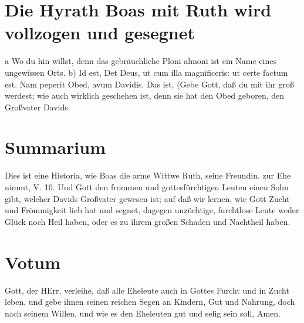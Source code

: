 \section{Die Hyrath Boas mit Ruth wird vollzogen und gesegnet}

a Wo du hin willst, denn das gebräuchliche Ploni almoni ist ein Name eines ungewissen Orts.
b) Id est, Det Deus, ut cum illa magnificeris: ut certe factum est. Nam peperit Obed, avum Davidis. Das ist, (Gebe Gott, daß du mit ihr groß werdest; wie auch wirklich geschehen ist, denn sie hat den Obed geboren, den Großvater Davids.

\section{Summarium}

Dies ist eine Historia, wie Boas die arme Wittwe Ruth, seine Freundin, zur Ehe nimmt, V. 10. Und Gott den frommen und gottesfürchtigen Leuten einen Sohn gibt, welcher Davids Großvater gewesen ist; auf daß wir lernen, wie Gott Zucht und Frömmigkeit lieb hat und segnet, dagegen unzüchtige, furchtlose Leute weder Glück noch Heil haben, oder es zu ihrem großen Schaden und Nachtheil haben.

\section{Votum}

Gott, der HErr, verleihe, daß alle Eheleute auch in Gottes Furcht und in Zucht leben, und gebe ihnen seinen reichen Segen an Kindern, Gut und Nahrung, doch nach seinem Willen, und wie es den Eheleuten gut und selig sein soll, Amen.
